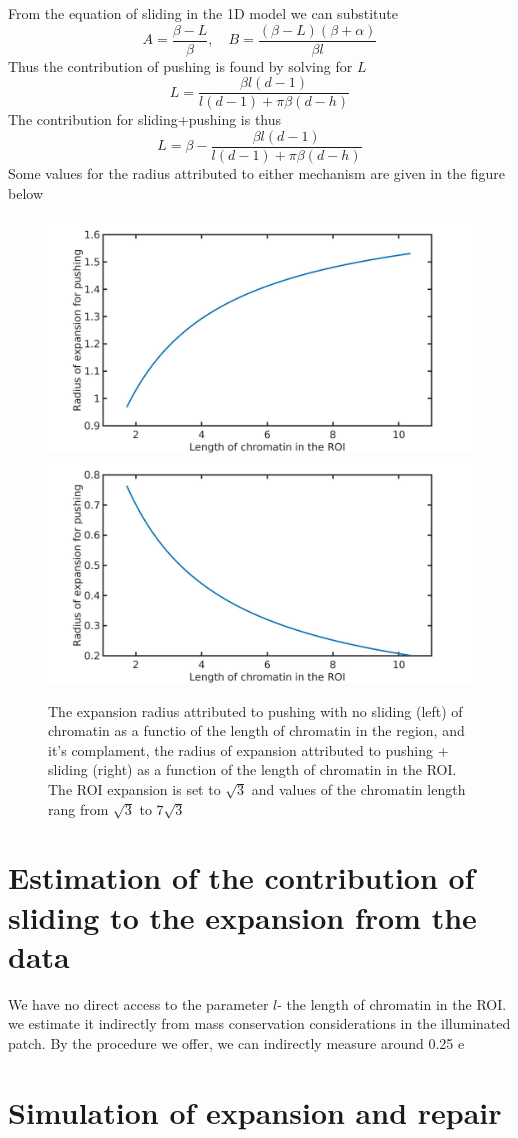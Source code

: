 \documentclass[12pt]{report}
\begin{document}
		From the equation of sliding in the 1D model we can substitute 
		\begin{equation*}
		A= \frac{\beta-L}{\beta}, \quad B=\frac{(\beta -L)(\beta+\alpha)}{\beta l}
		\end{equation*}
		Thus the contribution of pushing is found by solving for $L$ 
		\begin{equation*}
     	 L = \frac{\beta l(d-1)}{l(d-1) +\pi \beta(d-h)}
		\end{equation*}
		The contribution for sliding+pushing is thus 
		\begin{equation*}
		L = \beta- \frac{\beta l(d-1)}{l(d-1) +\pi \beta(d-h)}
		\end{equation*}
		Some values for the radius attributed to either mechanism are given in the figure below
		\begin{figure}[H]
			
			\includegraphics[width=0.5\linewidth, height=0.3\textheight]{Images/SlidingModel/radiusOfPushingVsLengthOfChromainInROI}
			\includegraphics[width=0.5\linewidth, height=0.3\textheight]{Images/SlidingModel/radiusOfSlidingVsLengthOfChromatinInROI}
			\caption{\tiny{The expansion radius attributed to pushing with no sliding (left) of chromatin as a functio of the length of chromatin in the region, and it's complament, the radius of expansion attributed to pushing + sliding (right) as a function of the length of chromatin in the ROI. The ROI expansion is set to $\sqrt{3}$ and values of the chromatin length rang from $\sqrt{3}$ to $7\sqrt{3}$}}
			\label{fig:radiiVsLengthOfChromainInROI}
		\end{figure}
		
									
		\section{Estimation of the contribution of sliding to the expansion from the data}
		We have no direct access to the parameter $l$- the length of chromatin in the ROI. we estimate it indirectly from mass conservation considerations in the illuminated patch.
		By the procedure we offer, we can indirectly measure around 0.25 e
		
		\section{Simulation of expansion and repair}
		
		
		
\end{document}
